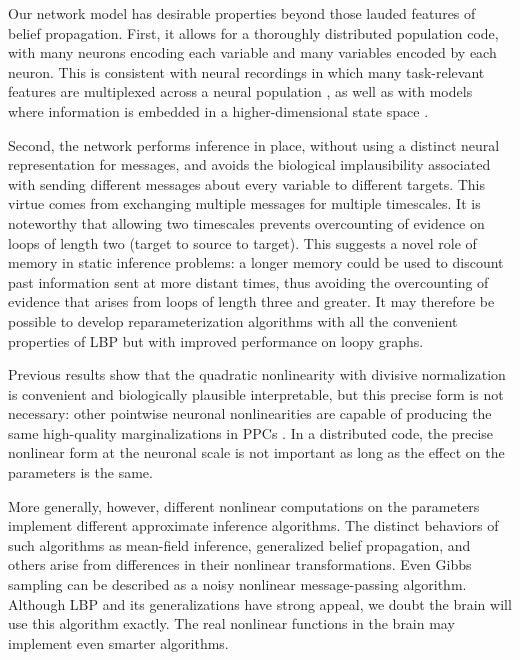 \documentclass{article}
\begin{document}
Our network model has desirable properties beyond those lauded features of belief propagation. First, it allows for a thoroughly distributed population code, with many neurons encoding each variable and many variables encoded by each neuron. This is consistent with neural recordings in which many task-relevant features are multiplexed across a neural population \cite{hayden2010neurons,rigotti2013importance,raposo2014category}, as well as with models where information is embedded in a higher-dimensional state space \cite{savin2014spatio,archer2015}.

Second, the network performs inference in place, without using a distinct neural representation for messages, and avoids the biological implausibility associated with sending different messages about every variable to different targets. This virtue comes from exchanging multiple messages for multiple timescales. It is noteworthy that allowing two timescales prevents overcounting of evidence on loops of length two (target to source to target). This suggests a novel role of memory in static inference problems: a longer memory could be used to discount past information sent at more distant times, thus avoiding the overcounting of evidence that arises from loops of length three and greater. It may therefore be possible to develop reparameterization algorithms with all the convenient properties of LBP but with improved performance on loopy graphs.
 
Previous results show that the quadratic nonlinearity with divisive normalization is convenient and biologically plausible interpretable, but this precise form is not necessary: other pointwise neuronal nonlinearities are capable of producing the same high-quality marginalizations in PPCs \cite{vasudeva2015marginalization}. In a distributed code, the precise nonlinear form at the neuronal scale is not important as long as the effect on the parameters is the same.

More generally, however, different nonlinear computations on the parameters implement different approximate inference algorithms. The distinct behaviors of such algorithms as mean-field inference, generalized belief propagation, and others arise from differences in their nonlinear transformations. Even Gibbs sampling can be described as a noisy nonlinear message-passing algorithm. Although LBP and its generalizations have strong appeal, we doubt the brain will use this algorithm exactly. The real nonlinear functions in the brain may implement even smarter algorithms.
\end{document}
